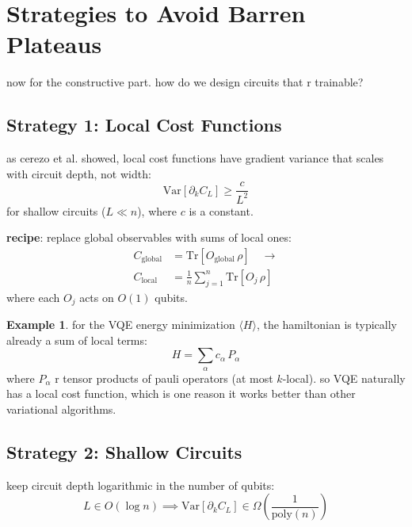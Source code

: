 \documentclass[11pt,a4paper]{article}
\theoremstyle{definition}
\newtheorem{example}{Example}[section]
\theoremstyle{remark}
\begin{document}
\section{Strategies to Avoid Barren Plateaus}

now for the constructive part. how do we design circuits that r trainable?

\subsection{Strategy 1: Local Cost Functions}

as cerezo et al. showed, local cost functions have gradient variance that scales with circuit depth, not width:
\begin{equation}
    \text{Var}[\partial_k C_L] \geq \frac{c}{L^2}
\end{equation}
for shallow circuits ($L \ll n$), where $c$ is a constant.

\textbf{recipe}: replace global observables with sums of local ones:
\begin{align}
    C_{\text{global}} &= \text{Tr}[O_{\text{global}} \, \rho] \quad \longrightarrow \\
    C_{\text{local}} &= \frac{1}{n} \sum_{j=1}^{n} \text{Tr}[O_j \, \rho]
\end{align}
where each $O_j$ acts on $O(1)$ qubits.

\begin{example}
for the VQE energy minimization $\langle H \rangle$, the hamiltonian is typically already a sum of local terms:
\[
H = \sum_{\alpha} c_\alpha \, P_\alpha
\]
where $P_\alpha$ r tensor products of pauli operators (at most $k$-local). so VQE naturally has a local cost function, which is one reason it works better than other variational algorithms.
\end{example}

\subsection{Strategy 2: Shallow Circuits}

keep circuit depth logarithmic in the number of qubits:
\begin{equation}
    L \in O(\log n) \implies \text{Var}[\partial_k C_L] \in \Omega\left(\frac{1}{\text{poly}(n)}\right)
\end{equation}
\end{document}
